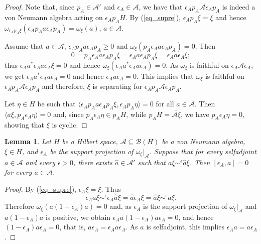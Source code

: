 \documentclass[11pt]{amsart}
\newtheorem{lemma}[theorem]{Lemma}
\theoremstyle{definition}
\newcommand{\cl}[1]{\mathcal{#1}}
\begin{document}
\begin{proof}
Note that, since $p_A\in\cl A'$ and $\epsilon_A\in\cl A$, 
we have that $\epsilon_Ap_A\cl A\epsilon_Ap_A$ is indeed 
a von Neumann algebra acting on $\epsilon_Ap_AH$. 
By (\ref{eq_supre}), $\epsilon_Ap_A\xi=\xi$ and hence 
$\omega_{\epsilon_Ap_A\xi}(\epsilon_Ap_Aa\epsilon_Ap_A)=\omega_\xi(a)$, 
$a\in\cl A$. 

Assume that $a\in\cl A$, $\epsilon_Ap_Aa\epsilon_Ap_A\geq 0$ and $\omega_\xi(p_A\epsilon_Aa\epsilon_Ap_A)=0$. Then 
$$0 = p_A\epsilon_Aa\epsilon_Ap_A\xi=\epsilon_Aa\epsilon_Ap_A\xi=\epsilon_Aa\epsilon_A\xi;$$ 
thus $\epsilon_Aa^*\epsilon_Aa\epsilon_A\xi=0$ and hence
$\omega_\xi(\epsilon_Aa^*\epsilon_Aa\epsilon_A)=0$. As $\omega_\xi$ is faithful 
on $\epsilon_A\cl A\epsilon_A$, we get $\epsilon_Aa^*\epsilon_Aa\epsilon_A=0$ and hence $\epsilon_Aa\epsilon_A=0$. 
This implies that $\omega_{\xi}$ is faithful on $\epsilon_Ap_A\cl A\epsilon_Ap_A$ and therefore, $\xi$ is separating for $\epsilon_Ap_A\cl A\epsilon_Ap_A$.

Let $\eta\in H$ be such that
$\langle \epsilon_Ap_Aa\epsilon_Ap_A\xi, \epsilon_Ap_A\eta\rangle=0$
for all $a\in\cl A$. Then 
$\langle a\xi, p_A\epsilon_A\eta\rangle=0$ and, 
since $p_A\epsilon_A\eta \in p_AH$, while 
$p_AH = \overline{\cl A\xi}$, 
we have $p_A\epsilon_A\eta=0$, showing that $\xi$ is cyclic. 
\end{proof}


\begin{lemma}\label{support_com}
Let $H$ be a Hilbert space, $\cl A\subseteq \cl B(H)$ be a von Neumann algebra, 
$\xi\in H$, and $\epsilon_A$ be the support projection of $\omega_\xi|_{\cl A}$. 
Suppose that for every selfadjoint $a\in\cl A$ and 
every $\epsilon > 0$, there exists
$\hat a\in\cl A'$ such that $a\xi\sim^\epsilon\hat a\xi$. Then $[\epsilon_A,a] = 0$
for every $a\in \cl A$.
    \end{lemma}
    
    \begin{proof}
        By (\ref{eq_supre}), $\epsilon_A\xi=\xi$.
        Thus 
        $$\epsilon_Aa\xi\sim^{\epsilon}\epsilon_A\hat a\xi=\hat a\epsilon_A\xi=\hat a\xi\sim^{\epsilon}a\xi.$$
        Therefore $\omega_\xi(a(1-\epsilon_A)a)=0$ and, as 
        $\epsilon_A$ is the support projection of $\omega_{\xi}|_{\cl A}$ 
        and $a(1-\epsilon_A)a$ is positive, we obtain 
        $\epsilon_Aa(1-\epsilon_A)a\epsilon_A=0$, and hence $(1-\epsilon_A)a\epsilon_A=0$,
        that is, 
        $a\epsilon_A=\epsilon_A a\epsilon_A$. As $a$ is selfadjoint, 
        this implies $\epsilon_A a = a\epsilon_A$.
    \end{proof}
\end{document}
